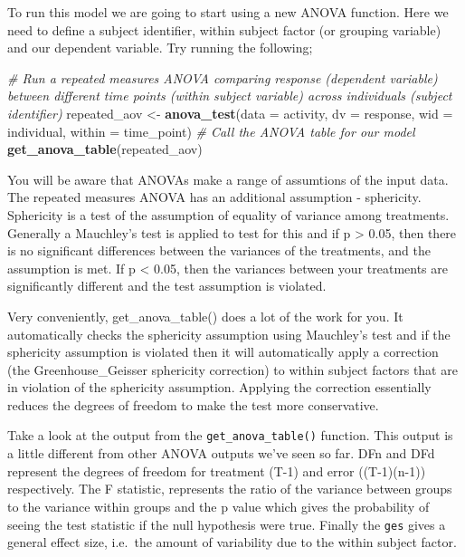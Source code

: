 \documentclass[
]{book}
\newenvironment{Shaded}{\begin{snugshade}}{\end{snugshade}}
\newcommand{\AttributeTok}[1]{\textcolor[rgb]{0.13,0.29,0.53}{#1}}
\newcommand{\CommentTok}[1]{\textcolor[rgb]{0.56,0.35,0.01}{\textit{#1}}}
\newcommand{\FunctionTok}[1]{\textcolor[rgb]{0.13,0.29,0.53}{\textbf{#1}}}
\newcommand{\NormalTok}[1]{#1}
\newcommand{\OtherTok}[1]{\textcolor[rgb]{0.56,0.35,0.01}{#1}}
\begin{document}
To run this model we are going to start using a new ANOVA function. Here we need to define a subject identifier, within subject factor (or grouping variable) and our dependent variable. Try running the following;

\begin{Shaded}
\begin{Highlighting}[]
\CommentTok{\# Run a repeated measures ANOVA comparing response (dependent variable) between different time points (within subject variable) across individuals (subject identifier)}
\NormalTok{repeated\_aov }\OtherTok{\textless{}{-}} \FunctionTok{anova\_test}\NormalTok{(}\AttributeTok{data =}\NormalTok{ activity, }\AttributeTok{dv =}\NormalTok{ response, }\AttributeTok{wid =}\NormalTok{ individual, }\AttributeTok{within =}\NormalTok{ time\_point)}
\CommentTok{\# Call the ANOVA table for our model}
\FunctionTok{get\_anova\_table}\NormalTok{(repeated\_aov)}
\end{Highlighting}
\end{Shaded}

You will be aware that ANOVAs make a range of assumtions of the input data. The repeated measures ANOVA has an additional assumption - sphericity. Sphericity is a test of the assumption of equality of variance among treatments. Generally a Mauchley's test is applied to test for this and if p \textgreater{} 0.05, then there is no significant differences between the variances of the treatments, and the assumption is met. If p \textless{} 0.05, then the variances between your treatments are significantly different and the test assumption is violated.

Very conveniently, get\_anova\_table() does a lot of the work for you. It automatically checks the sphericity assumption using Mauchley's test and if the sphericity assumption is violated then it will automatically apply a correction (the Greenhouse\_Geisser sphericity correction) to within subject factors that are in violation of the sphericity assumption. Applying the correction essentially reduces the degrees of freedom to make the test more conservative.

Take a look at the output from the \texttt{get\_anova\_table()} function. This output is a little different from other ANOVA outputs we've seen so far. DFn and DFd represent the degrees of freedom for treatment (T-1) and error ((T-1)(n-1)) respectively. The F statistic, represents the ratio of the variance between groups to the variance within groups and the p value which gives the probability of seeing the test statistic if the null hypothesis were true. Finally the \texttt{ges} gives a general effect size, i.e.~the amount of variability due to the within subject factor.
\end{document}
